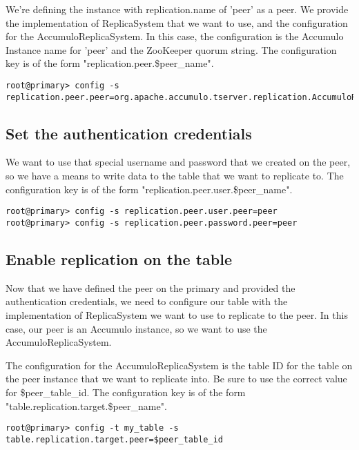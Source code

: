 We're defining the instance with replication.name of 'peer' as a peer. We provide the implementation of ReplicaSystem
that we want to use, and the configuration for the AccumuloReplicaSystem. In this case, the configuration is the Accumulo
Instance name for 'peer' and the ZooKeeper quorum string. The configuration key is of the form
"replication.peer.\$peer\_name".

\begingroup\fontsize{8pt}{8pt}\selectfont\begin{verbatim}
root@primary> config -s replication.peer.peer=org.apache.accumulo.tserver.replication.AccumuloReplicaSystem,peer,$peer_zk_quorum
\end{verbatim}\endgroup

\subsection{Set the authentication credentials}

We want to use that special username and password that we created on the peer, so we have a means to write data to
the table that we want to replicate to. The configuration key is of the form "replication.peer.user.\$peer\_name".

\begingroup\fontsize{8pt}{8pt}\selectfont\begin{verbatim}
root@primary> config -s replication.peer.user.peer=peer
root@primary> config -s replication.peer.password.peer=peer
\end{verbatim}\endgroup

\subsection{Enable replication on the table}

Now that we have defined the peer on the primary and provided the authentication credentials, we need to configure
our table with the implementation of ReplicaSystem we want to use to replicate to the peer. In this case, our peer 
is an Accumulo instance, so we want to use the AccumuloReplicaSystem.

The configuration for the AccumuloReplicaSystem is the table ID for the table on the peer instance that we
want to replicate into. Be sure to use the correct value for \$peer\_table\_id. The configuration key is of
the form "table.replication.target.\$peer\_name".

\begingroup\fontsize{8pt}{8pt}\selectfont\begin{verbatim}
root@primary> config -t my_table -s table.replication.target.peer=$peer_table_id
\end{verbatim}\endgroup

